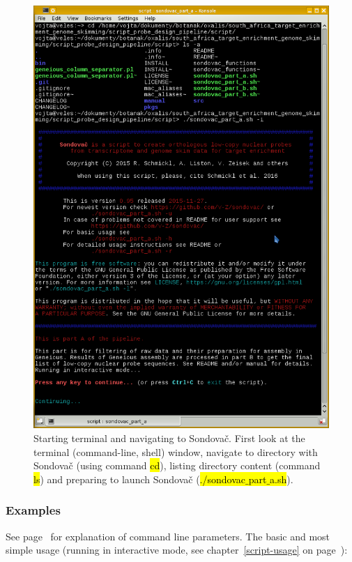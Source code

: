 \documentclass[a4paper, 11pt, twoside]{article}
\renewcommand{\texttt}[1]{\hl{\ttfamily #1}}
\begin{document}
\begin{figure}[htbp]
  \includegraphics[width=\textwidth]{terminal.png}
  \caption[Starting terminal and navigating to Sondovač]{Starting terminal and navigating to Sondovač. First look at the terminal (command-line, shell) window, navigate to directory with Sondovač (using command \texttt{cd}), listing directory content (command \texttt{ls}) and preparing to launch Sondovač (\texttt{./sondovac$\_$part$\_$a.sh}).}
  \label{terminal}
\end{figure}

\subsubsection{Examples}

See page~\pageref{script-usage} for explanation of command line parameters. The basic and most simple usage (running in interactive mode, see chapter~\ref{script-usage} on page~\pageref{script-usage}):
\end{document}
